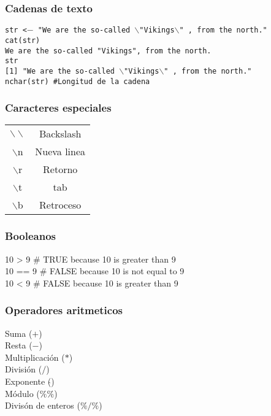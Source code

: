 \documentclass[12pt]{beamer}
\begin{document}
	\begin{frame}
		\frametitle{Cadenas de texto}
		\texttt{str <$-$ "We are the so-called  $\backslash$"Vikings$\backslash$"  , from the north."}\\
		\texttt{cat(str)}\\
		\texttt{We are the so-called "Vikings", from the north.}\\
		\texttt{str}\\
		\texttt{[1] "We are the so-called  $\backslash$"Vikings$\backslash$" , from the north."}\\
		\texttt{nchar(str) \#Longitud de la cadena}
		
	\end{frame}

	\begin{frame}
		\frametitle{Caracteres especiales}
		
		\begin{table}
			\centering
		\begin{tabular}{cc}
			\hline
			$\backslash \backslash$  & Backslash\\
			$\backslash$n& Nueva linea\\
			$\backslash$r&  Retorno\\
			$\backslash$t&  tab\\
			$\backslash$b&  Retroceso\\
			\hline
		\end{tabular}
	\end{table}
		
	\end{frame}

	\begin{frame}
		\frametitle{Booleanos}
		
		10 > 9    \# TRUE because 10 is greater than 9 \\
		10 == 9   \# FALSE because 10 is not equal to 9 \\
		10 < 9    \# FALSE because 10 is greater than 9
		
	\end{frame}

	\begin{frame}
		\frametitle{Operadores aritmeticos}
		Suma ($+$)\\
		Resta ($-$) \\
		Multiplicación ($*$)\\
		División ($/$) \\
		Exponente ($\hat{}$)\\
		Módulo ($\%\%$) \\
		Divisón de enteros ($\%/\%$)
	\end{frame}
\end{document}
